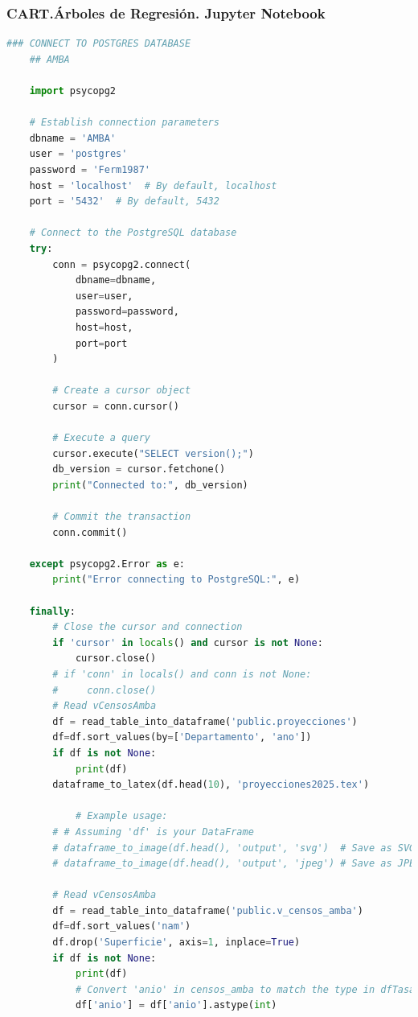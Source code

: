 \documentclass{article}
\theoremstyle{mytheoremstyle}
\theoremstyle{mytheoremstyle}
\theoremstyle{myproblemstyle}
\begin{document}
\subsubsection{CART.Árboles de Regresión. Jupyter Notebook} 
  \begin{lstlisting}[language=Python, caption=RegTrees.ipynb,label={lst:LR.ipynb}]
    ### CONNECT TO POSTGRES DATABASE
    ## AMBA
    
    import psycopg2
    
    # Establish connection parameters
    dbname = 'AMBA'
    user = 'postgres'
    password = 'Ferm1987'
    host = 'localhost'  # By default, localhost
    port = '5432'  # By default, 5432
    
    # Connect to the PostgreSQL database
    try:
        conn = psycopg2.connect(
            dbname=dbname,
            user=user,
            password=password,
            host=host,
            port=port
        )
    
        # Create a cursor object
        cursor = conn.cursor()
    
        # Execute a query
        cursor.execute("SELECT version();")
        db_version = cursor.fetchone()
        print("Connected to:", db_version)
    
        # Commit the transaction
        conn.commit()
    
    except psycopg2.Error as e:
        print("Error connecting to PostgreSQL:", e)
    
    finally:
        # Close the cursor and connection
        if 'cursor' in locals() and cursor is not None:
            cursor.close()
        # if 'conn' in locals() and conn is not None:
        #     conn.close()
        # Read vCensosAmba
        df = read_table_into_dataframe('public.proyecciones')
        df=df.sort_values(by=['Departamento', 'ano'])
        if df is not None:
            print(df)
        dataframe_to_latex(df.head(10), 'proyecciones2025.tex')
        
            # Example usage:
        # # Assuming 'df' is your DataFrame
        # dataframe_to_image(df.head(), 'output', 'svg')  # Save as SVG image
        # dataframe_to_image(df.head(), 'output', 'jpeg') # Save as JPEG image
        
        # Read vCensosAmba
        df = read_table_into_dataframe('public.v_censos_amba')
        df=df.sort_values('nam')
        df.drop('Superficie', axis=1, inplace=True)
        if df is not None:
            print(df)
            # Convert 'anio' in censos_amba to match the type in dfTasas
            df['anio'] = df['anio'].astype(int)
            

\end{lstlisting}
\end{document}
